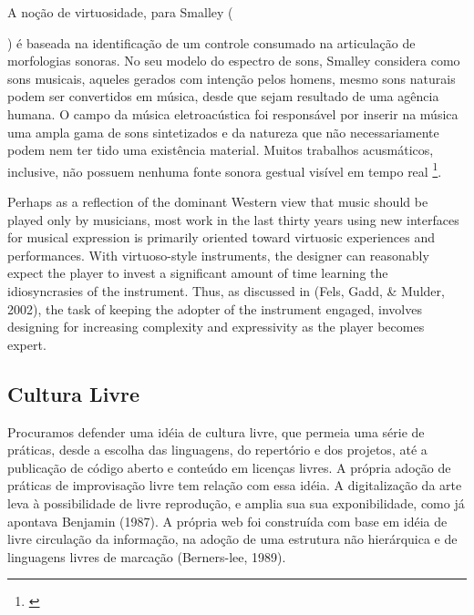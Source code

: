 A noção de virtuosidade, para Smalley ({\citeyear{Smalley1996}) é baseada na identificação de um controle consumado na articulação de morfologias sonoras. No seu modelo do espectro de sons, Smalley considera como sons musicais, aqueles gerados com intenção pelos homens, mesmo sons naturais podem ser convertidos em música, desde que sejam resultado de uma agência humana. O campo da música eletroacústica foi responsável por inserir na música uma ampla gama de sons sintetizados e da natureza que não necessariamente podem nem ter tido uma existência material. Muitos trabalhos acusmáticos, inclusive, não possuem nenhuma fonte sonora gestual visível em tempo real \footnote{\cite[95, 101]{Smalley1996}}.



\begin{citacao}
Perhaps as a reflection of the dominant Western view that music should be played only by musicians, most work in the last thirty years using new interfaces for musical expression is primarily oriented toward virtuosic experiences and performances. With virtuoso-style instruments, the designer can reasonably expect the player to invest a significant amount of time learning the idiosyncrasies of the instrument. Thus, as discussed in (Fels, Gadd, \& Mulder, 2002), the task of keeping the adopter of the instrument engaged, involves designing for increasing complexity and expressivity as the player becomes expert. \cite{Blaine2003}

\end{citacao}




\subsection{Cultura Livre}

Procuramos defender uma idéia de cultura livre, que permeia uma série de práticas, desde a escolha das linguagens, do repertório e dos projetos, até a publicação de código aberto e conteúdo em licenças livres. A própria adoção de práticas de improvisação livre tem relação com essa idéia. A digitalização da arte leva à possibilidade de livre reprodução, e amplia sua sua exponibilidade, como já apontava Benjamin (1987). A própria web foi construída com base em idéia de livre circulação da informação, na adoção de uma estrutura não hierárquica e de linguagens livres de marcação (Berners-lee, 1989).









}
